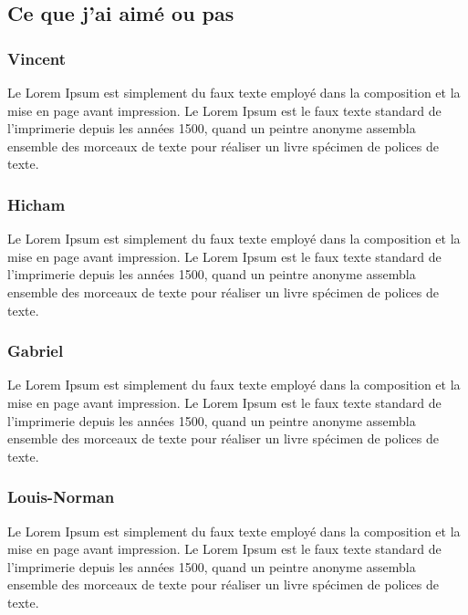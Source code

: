\subsection{Ce que j'ai aimé ou pas}
\begin{multicols}{4}
\subsubsection{Vincent}
Le Lorem Ipsum est simplement du faux texte employé dans la composition et la mise en page avant impression. Le Lorem Ipsum est le faux texte standard de l'imprimerie depuis les années 1500, quand un peintre anonyme assembla ensemble des morceaux de texte pour réaliser un livre spécimen de polices de texte.
\subsubsection{Hicham}
Le Lorem Ipsum est simplement du faux texte employé dans la composition et la mise en page avant impression. Le Lorem Ipsum est le faux texte standard de l'imprimerie depuis les années 1500, quand un peintre anonyme assembla ensemble des morceaux de texte pour réaliser un livre spécimen de polices de texte.
\subsubsection{Gabriel}
Le Lorem Ipsum est simplement du faux texte employé dans la composition et la mise en page avant impression. Le Lorem Ipsum est le faux texte standard de l'imprimerie depuis les années 1500, quand un peintre anonyme assembla ensemble des morceaux de texte pour réaliser un livre spécimen de polices de texte.
\subsubsection{Louis-Norman}
Le Lorem Ipsum est simplement du faux texte employé dans la composition et la mise en page avant impression. Le Lorem Ipsum est le faux texte standard de l'imprimerie depuis les années 1500, quand un peintre anonyme assembla ensemble des morceaux de texte pour réaliser un livre spécimen de polices de texte.
\end{multicols}

\begin{center}\HRule \end{center}
